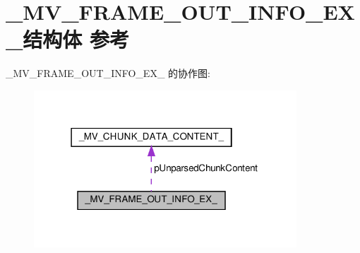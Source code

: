 \hypertarget{struct___m_v___f_r_a_m_e___o_u_t___i_n_f_o___e_x__}{}\section{\+\_\+\+M\+V\+\_\+\+F\+R\+A\+M\+E\+\_\+\+O\+U\+T\+\_\+\+I\+N\+F\+O\+\_\+\+E\+X\+\_\+结构体 参考}
\label{struct___m_v___f_r_a_m_e___o_u_t___i_n_f_o___e_x__}


\+\_\+\+M\+V\+\_\+\+F\+R\+A\+M\+E\+\_\+\+O\+U\+T\+\_\+\+I\+N\+F\+O\+\_\+\+E\+X\+\_\+ 的协作图\+:\nopagebreak
\begin{figure}[H]
\begin{center}
\leavevmode
\includegraphics[width=279pt]{struct___m_v___f_r_a_m_e___o_u_t___i_n_f_o___e_x____coll__graph}
\end{center}
\end{figure}
